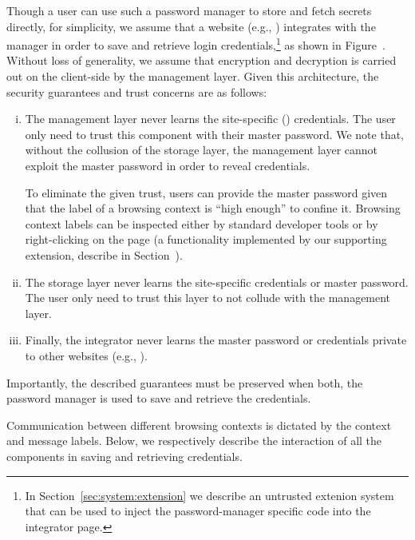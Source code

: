 %
Though a user can use such a password manager to store and fetch secrets
directly, for simplicity, we assume that a website (e.g., )
integrates with the manager in order to save and retrieve login
credentials,\footnote{ In Section~\ref{sec:system:extension} we describe an
  untrusted extenion system that can be used to inject the password-manager
  specific code into the integrator page.  } as shown in
Figure~.
%
Without loss of generality, we assume that encryption and
decryption is carried out on the client-side by the management layer.
%
Given this architecture, the security guarantees and trust concerns
are as follows:
\begin{enumerate}[i)]
\item The management layer never learns the site-specific ()
  credentials. The user only need to trust this component with their master
  password. We note that, without the collusion of the storage layer, the
  management layer cannot exploit the master password in order to reveal
  credentials.

  To eliminate the given trust, users can provide the master password given 
  that the label of a browsing context is ``high enough'' to confine it. 
  Browsing context labels can be inspected either by standard developer tools or
  by right-clicking on the page (a functionality implemented by our supporting
  extension, describe in Section~).

\item The storage layer never learns the site-specific credentials or master
  password. The user only need to trust this layer to not collude with the
  management layer. 
\item Finally, the integrator never learns the master password or
  credentials private to other websites (e.g., ).
\end{enumerate}
%
Importantly, the described guarantees must be preserved when both, the
password manager is used to save and retrieve the credentials.


Communication between different browsing contexts is dictated by the
context and message labels.
%
Below, we respectively describe the interaction of all the components
in saving and retrieving credentials.

